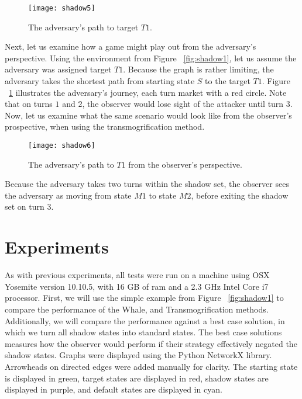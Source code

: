 \begin{figure}[h!]
\begin{center}

  \texttt{[image: shadow5]}
  \end{center}

  \caption{The adversary's path to target $T1$.}
  
  \label{fig:shadow5}
\end{figure}

Next, let us examine how a game might play out from the adversary's perspective.   Using the environment from Figure ~\ref{fig:shadow1}, let us assume the adversary was assigned target $T1$. Because the graph is rather limiting, the adversary takes the shortest path from starting state $S$ to the target $T1$. Figure ~\ref{fig:shadow5} illustrates the adversary's journey, each turn market with a red circle. Note that on turns $1$ and $2$, the observer would lose sight of the attacker until turn $3$. Now, let us examine what the same scenario would look like from the observer's prospective, when using the transmogrification method. 

\begin{figure}[h!]
\begin{center}

  \texttt{[image: shadow6]}
  \end{center}

  \caption{The adversary's path to $T1$ from the observer's perspective.}
  
  \label{fig:shadow6}
\end{figure}

Because the adversary takes two turns within the shadow set, the observer sees the adversary as moving from state $M1$ to state $M2$, before exiting the shadow set on turn 3. 


\section{Experiments}

As with previous experiments, all tests were run on  a machine using OSX Yosemite version 10.10.5, with 16 GB of ram and a 2.3 GHz Intel Core i7 processor. First, we will use the simple example from Figure ~\ref{fig:shadow1} to compare the performance of the Whale, and Transmogrification methods. Additionally, we will compare the performance against a best case solution, in which we turn all shadow states into standard states. The best case solutions measures how the observer would perform if their strategy effectively negated the shadow states. Graphs were displayed using the Python NetworkX library. Arrowheads on directed edges were added manually for clarity. The starting state is displayed in green, target states are displayed in red, shadow states are displayed in purple, and default states are displayed in cyan.


